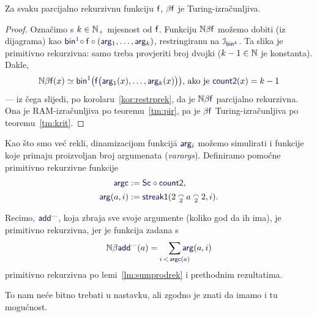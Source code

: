 

\begin{teorem}[{name=[Turing-izračunljivost parcijalno rekurzivnih brojevnih funkcija]}]\label{tm:pibt}
Za svaku parcijalno rekurzivnu funkciju $\f f$, $\beta\f f$ je Turing-izračunljiva.
\end{teorem}
\begin{proof}
Označimo s $k\in{\mathbb N}_+$ mjesnost od $\f f$. %
    Funkciju $\N\beta\f f$ možemo dobiti (iz dijagrama) kao $\f{bin}^1\!\circ\f f\circ(\f{arg}_1,\dotsc,\f{arg}_k)$, restringiranu na $\im{\f{bin}^k}$. Ta slika je primitivno rekurzivna: samo treba provjeriti broj dvojki ($k-1\in{\mathbb N}$ je konstanta).
Dakle,
\begin{equation}
\label{eq:defNbetaf}
    \N\beta\f f(x)\simeq\f{bin}^1\bigl(\f f\bigl(\f{arg}_1(x),\dotsc,\f{arg}_k(x)\bigr)\bigr)\text{, ako je }\f{count2}(x)=k-1
\end{equation}
--- iz čega slijedi, po korolaru~\ref{kor:restrprek}, da je $\N\beta\f f$ parcijalno rekurzivna. Ona je RAM-izračunljiva po teoremu~\ref{tm:pir},  pa je $\beta\f f$ Turing-iz\-rač\-un\-lji\-va po teoremu~\ref{tm:krit}.
\end{proof}

Kao što smo već rekli, dinamizacijom funkcij\=a $\f{arg}_i$ možemo simulirati i funkcije koje primaju proizvoljan broj argumenata (\emph{varargs}). Definiramo pomoćne primitivno rekurzivne funkcije
\begin{align}
\f{argc}&:=\f{Sc}\circ\f{count2}\text,\\
\f{arg}(a,i)&:=\f{streak1}(2\conc2a\conc22,i)\text.
\end{align}

\begin{primjer}[{name=[implementacija \emph{varargs} pomoću binarnog kodiranja]}]
Recimo, $\f{add}^{\cdots}$, koja zbraja sve svoje argumente (koliko god da ih ima), je primitivno rekurzivna, jer je funkcija zadana s
\begin{equation}
\N\beta\f{add}^{\cdots}(a)=\quad\sum_{\mathclap{i\,<\,\f{argc}(a)}}\f{arg}(a,i)
\end{equation}
primitivno rekurzivna po lemi~\ref{lm:sumprodrek} i prethodnim rezultatima.
\end{primjer}
To nam neće bitno trebati u nastavku, ali zgodno je znati da imamo i tu mogućnost.
